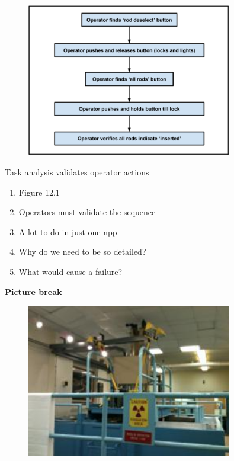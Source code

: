\documentclass[aspectratio=1610,pdftex,dvipsnames,compress,xcolor={dvipsnames}]{beamer}
\newcommand{\acs}{\acrshort} %
\begin{document}
\begin{frame}{}
    \begin{figure}
        \centering
        \includegraphics[width=0.80\textwidth]{hra_rods.inserted.jpg}
    \end{figure}
\end{frame}


\begin{frame}{Task analysis validates operator actions}
    \begin{enumerate}[series=outerlist,topsep=0pt,itemsep=21pt,leftmargin=*,label=(\arabic*)]
        \item[]Figure 12.1
        \item[]Operators must validate the sequence
        \item[]A lot to do in just one \acs{npp}
        \item[]Why do we need to be so detailed?
        \item[]What would cause a failure?
    \end{enumerate}
\end{frame}


\begin{frame}[plain]{}
    \centering\LARGE\textbf{Picture break}
\end{frame}


\begin{frame}{}
    \begin{figure}
        \centering
        \includegraphics[width=0.80\textwidth]{wpi.reactor1.jpg}
    \end{figure}
\end{frame}
\end{document}
